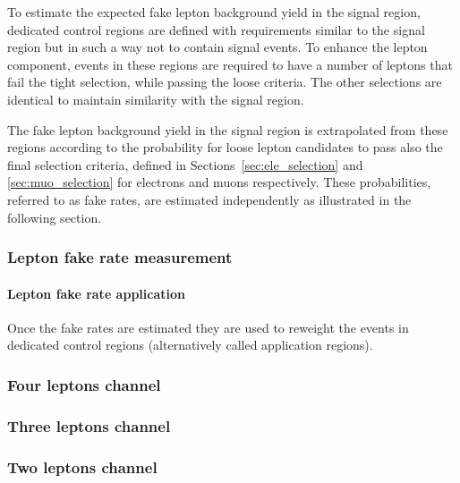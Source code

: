 \label{sec:fake_leptons}
To estimate the expected fake lepton background yield in the signal region,
dedicated control regions are defined with requirements similar to the signal region but in such a way not to contain signal events.
To enhance the \nonprompt lepton component, events in these regions are required to
have a number of leptons that fail the tight selection, while passing the loose criteria.
The other selections are identical to maintain similarity with the signal region.

The fake lepton background yield in the signal region is extrapolated from these regions
according to the probability for loose lepton candidates to pass also the final selection criteria,
defined in Sections~\ref{sec:ele_selection} and \ref{sec:muo_selection} for electrons and muons respectively.
These probabilities, referred to as fake rates, are estimated independently as illustrated in the following section.

\subsubsection{Lepton fake rate measurement}


\paragraph{Lepton fake rate application\\}
Once the fake rates are estimated they are used to reweight the events
in dedicated control regions (alternatively called application regions).

\subsubsection{Four leptons channel}


\subsubsection{Three leptons channel}


\subsubsection{Two leptons channel}


